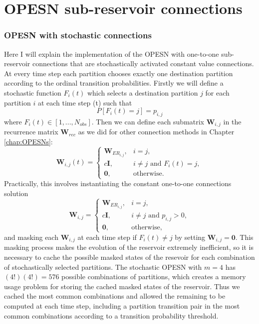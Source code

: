 \renewcommand{\chapterlabel}{Appendix}
\chapter{OPESN sub-reservoir connections}
\label{app:sub_reservoir_connections}

\subsection{OPESN with stochastic connections}

Here I will explain the implementation of the OPESN with one-to-one sub-reservoir connections that are stochastically activated constant value connections. At every time step each partition chooses exactly one destination partition according to the ordinal transition probabilities. Firstly we will define a stochastic function $F_{i}(t)$ which selects a destination partition $j$ for each partition $i$ at each time step (t) such that
\[
    P[F_{i}(t) = j] = p_{i,j}
\]
where $F_{i}(t) \in [1, ..., N_{obs}]$. Then we can define each submatrix $\mathbf{W}_{i,j}$ in the recurrence matrix $\mathbf{W}_{rec}$ as we did for other connection methods in Chapter \ref{chap:OPESNs}:
\[
\mathbf{W}_{i,j}(t) =
\begin{cases}
\mathbf{W}_{ER_{i,j}}, & i = j, \\
c\mathbf{I}, & i \neq j \text{ and } F_{i}(t) = j, \\
\mathbf{0}, & \text{otherwise}.
\end{cases}
\]
Practically, this involves instantiating the constant one-to-one connections solution
\[
\mathbf{W}_{i,j} =
\begin{cases}
\mathbf{W}_{ER_{i,j}}, & i = j, \\
c\mathbf{I}, & i \neq j \text{ and } p_{i,j} > 0, \\
\mathbf{0}, & \text{otherwise},
\end{cases}
\]
and masking each $\mathbf{W}_{i,j}$ at each time step if $F_{i}(t) \neq j$ by setting $\mathbf{W}_{i,j} = \mathbf{0}$. This masking process makes the evolution of the reservoir extremely inefficient, so it is necessary to cache the possible masked states of the resevoir for each combination of stochastically selected partitions. The stochastic OPESN with $m=4$ has $(4!)(4!)=576$ possible combinations of partitions, which creates a memory usage problem for storing the cached masked states of the reservoir. Thus we cached the most common combinations and allowed the remaining to be computed at each time step, including a partition transition pair in the most common combinations according to a transition probability threshold.


